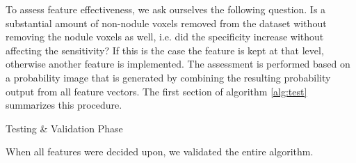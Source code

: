 To assess feature effectiveness, we ask ourselves the following question. Is a
substantial amount of non-nodule voxels removed from the dataset without
removing the nodule voxels as well, i.e. did the specificity increase without
affecting the sensitivity? If this is the case the feature is kept at that
level, otherwise another feature is implemented. The assessment is performed
based on a probability image that is generated by combining the resulting
probability output from all feature vectors. The first section of algorithm
\ref{alg:test} summarizes this procedure.

\begin{algorithm}[ht]
	\DontPrintSemicolon
	\caption{Testing \& Validation Phase\label{alg:test}}
\end{algorithm}

When all features were decided upon, we validated the entire algorithm.